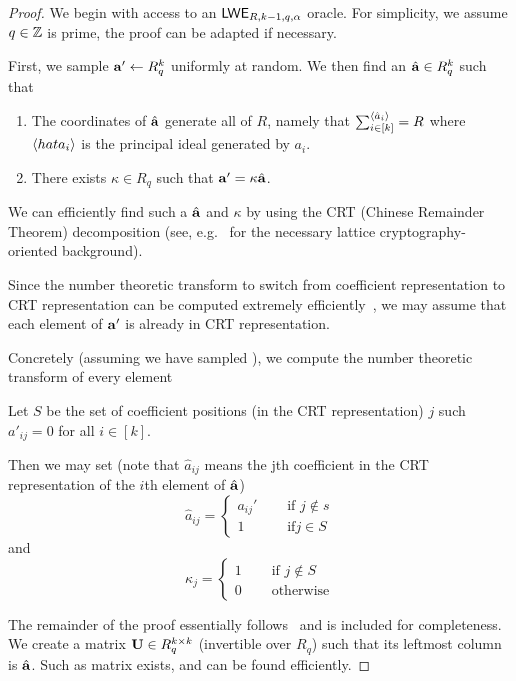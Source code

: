 \documentclass[oribibl,envcountsect,envcountsame]{llncs}
\begin{document}
\begin{proof}
We begin with access to an $\mathsf{LWE}_{R,k-1,q,\alpha}$ oracle. 
For simplicity, we assume $q \in \mathbb{Z}$ is prime, the proof can be adapted if necessary. 

First, we sample $\mathbf{a}' \gets R_q^{k}$ uniformly at random. We then find an $\hat{\mathbf{a}} \in R_q^{k}$ 
such that 
\begin{enumerate}
\item The coordinates of $\hat{\mathbf{a}}$ generate all of $R$, namely that
$\sum_{i \in [k]}^{\langle\hat{a}_i\rangle} = R$ where $\langle hat{a}_i\rangle$ is the principal ideal generated by 
$a_i$. 
\item There exists $\kappa \in R_q$  such that $\mathbf{a}' = \kappa\hat{\mathbf{a}}$. 
\end{enumerate}

We can efficiently find such a $\hat{\mathbf{a}}$ and $\kappa$ by using the CRT (Chinese Remainder Theorem) 
decomposition (see, e.g.~\cite{cryptoeprint:2011:133} for the necessary lattice cryptography-oriented background).

Since the number theoretic transform to switch from coefficient representation to CRT representation
can be computed extremely efficiently~\cite{longa2016speeding}, we may assume that each element of 
$\mathbf{a}'$ is already in CRT representation. 

Concretely (assuming we have sampled ), we compute the number theoretic transform of every element 

Let $S$ be the set of coefficient positions (in the CRT representation) $j$ such 
$a'_{ij} = 0$ for all $i \in [k]$.

Then we may set (note that $\hat{a}_{ij}$ means the jth coefficient in the CRT representation of the $i$th element of $\hat{\mathbf{a}}$) 
\[
\hat{a}_{ij} = \begin{cases}a_{ij}'&\quad \text{ if } j \notin s\\
                    1&\quad \text{ if} j \in S\end{cases} 
\]
and 
\[\kappa_{j} = \begin{cases}1&\quad\text{ if } j \notin S\\
                            0&\quad\text{ otherwise}\end{cases}\]

The remainder of the proof essentially follows~\cite{DBLP:conf/stoc/BrakerskiLPRS13} and 
is included for completeness. We create a 
matrix $\mathbf{U} \in R_q^{k \times k}$ (invertible over $R_q$) such that its leftmost column is $\hat{\mathbf{a}}$. 
Such as matrix exists, and can be found efficiently. 


\end{proof}
\end{document}
